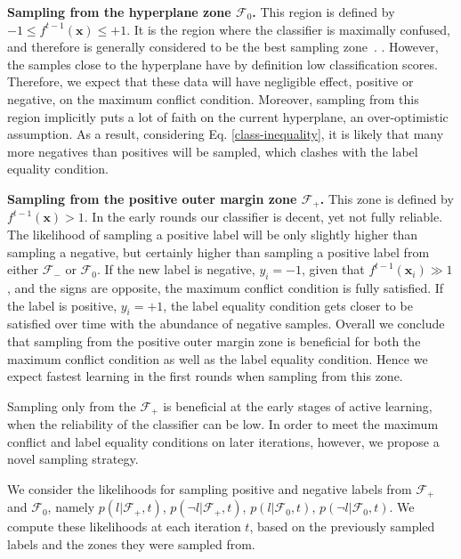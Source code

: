 \documentclass[10pt,twocolumn,letterpaper]{article}
\newcommand{\mb}[1]{\bm #1}
\newcommand{\eqr}[1]{Eq. \eqref{#1}}
\begin{document}
\textbf{Sampling from the hyperplane zone $\mathcal{F}_0$.} This region is defined by $-1 \leq f^{t-1}(\mb{x})  \leq +1$. It is the region where the classifier is maximally confused, and therefore is generally considered to be the best sampling zone~\cite{Schohn, Vijayanarasimhan2011}.
.
%
However, the samples close to the hyperplane have by definition low classification scores. Therefore, we expect that these data will have negligible effect, positive or negative, on the maximum conflict condition. Moreover, sampling from this region implicitly puts a lot of faith on the current hyperplane, an over-optimistic assumption. As a result, considering \eqr{class-inequality}, it is likely that many more negatives than positives will be sampled, which clashes with the label equality condition.

\textbf{Sampling from the positive outer margin zone $\mathcal{F}_+$.} This zone is defined by $f^{t-1}(\mb{x}) > 1$. 
In the early rounds our classifier is decent, yet not fully reliable. The likelihood of sampling a positive label will be only slightly higher than sampling a negative, but certainly higher than sampling a positive label from either $\mathcal{F}_-$ or $\mathcal{F}_0$.
If the new label is negative, $y_i=-1$, given that $f^{t-1}(\mb{x}_i) \gg 1$, and the signs are opposite, the maximum 
conflict condition is fully satisfied. If the label is positive, $y_i=+1$, the label equality condition gets closer to be satisfied over time with the abundance of negative samples.
Overall we conclude that sampling from the positive outer margin zone is beneficial for both the maximum conflict condition as well as the label equality condition. Hence we expect fastest learning in the first rounds when sampling from this zone.

Sampling only from the $\mathcal{F}_+$ is beneficial at the early stages of active learning, when the reliability of the classifier can be low. In order to meet the maximum conflict and label equality conditions on later iterations, however, we propose a novel sampling strategy.

We consider the likelihoods for sampling positive and negative labels from $\mathcal{F}_+$ and $\mathcal{F}_0$, namely $p(l|\mathcal{F}_+, t)$, $p(\neg l|\mathcal{F}_+, t)$, $p(l|\mathcal{F}_0, t)$, $p(\neg l|\mathcal{F}_0, t)$. We compute these likelihoods at each iteration $t$, based on the previously sampled labels and the zones they were sampled from.
\end{document}
